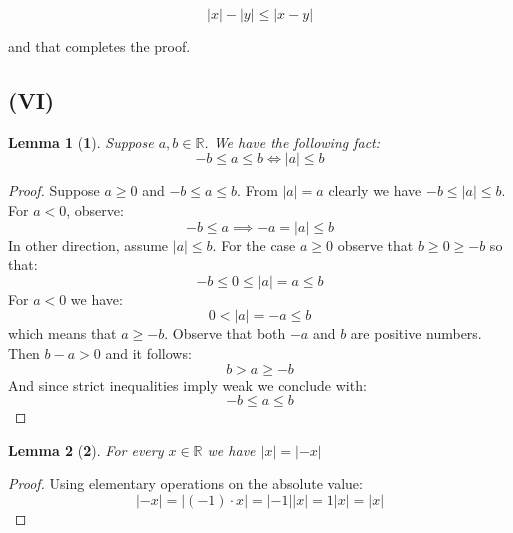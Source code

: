 \documentclass{article}
\newtheorem*{lemma}{Lemma}
\begin{document}
\begin{equation*}
	|x| - |y| \leq |x - y| 
\end{equation*}

and that completes the proof.

\subsection*{(VI)}

\begin{lemma}[\textbf{1}]
	Suppose \(a, b \in \mathbb{R}\). We have the following fact:
	\begin{equation*}
		-b \leq a \leq b \iff |a| \leq b
	\end{equation*}
\end{lemma}
\begin{proof}
	Suppose \(a \geq 0\) and \(-b \leq a \leq b\). From \(|a| = a\) clearly we have \(-b \leq |a| \leq b\).
	For \(a < 0\), observe:
	\begin{equation*}
		-b \leq a \implies -a = |a| \leq b
	\end{equation*}
	In other direction, assume \(|a| \leq b\). For the case \(a \geq 0\) observe that \(b \geq 0 \geq -b\) so that:
	\begin{equation*}
		-b \leq 0 \leq |a| = a \leq b
	\end{equation*}
	For \(a < 0\) we have:
	\begin{equation*}
		0 < |a| = -a \leq b
	\end{equation*}
	which means that \(a \geq -b\). Observe that both \(-a\) and \(b\) are positive numbers. Then \(b - a > 0\) and it follows:
	\begin{equation*}
		b > a \geq -b
	\end{equation*}
	And since strict inequalities imply weak we conclude with:
	\begin{equation*}
		-b \leq a \leq b
	\end{equation*}
\end{proof}

\begin{lemma}[\textbf{2}]
	For every \(x \in \mathbb{R}\) we have \(|x| = |-x|\)
\end{lemma}
\begin{proof}
	Using elementary operations on the absolute value:
	\begin{equation*}
		|-x| = |(-1) \cdot x| = |-1||x| = 1|x| = |x|
	\end{equation*}
\end{proof}
\newpage
\end{document}

